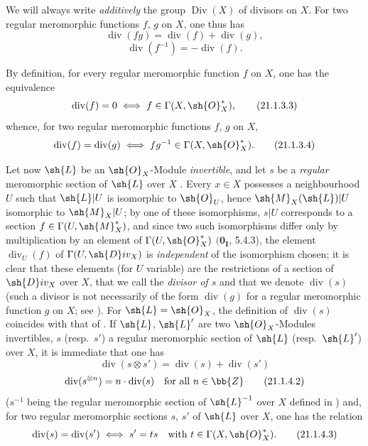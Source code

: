 \begin{env}[21.1.3]
\label{IV.21.1.3}
We will always write \emph{additively} the group $\operatorname{Div}(X)$ of divisors on $X$.
For two regular meromorphic functions $f$, $g$ on $X$, one thus has
\[
\label{IV.21.1.3.1}
  \operatorname{div}(fg)=\operatorname{div}(f)+\operatorname{div}(g),
  \tag{21.1.3.1}
\]
\[
\label{IV.21.1.3.2}
  \operatorname{div}(f^{-1})=-\operatorname{div}(f).
  \tag{21.1.3.2}
\]

By definition, for every regular meromorphic function $f$ on $X$, one has the equivalence
\[
\label{IV.21.1.3.3}
  \operatorname{div}(f)=0\iff f\in\Gamma(X,\sh{O}_X^*),
  \tag{21.1.3.3}
\]
whence, for two regular meromorphic functions $f$, $g$ on $X$,
\[
\label{IV.21.1.3.4}
  \operatorname{div}(f)=\operatorname{div}(g)\iff fg^{-1}\in\Gamma(X,\sh{O}_X^*).
  \tag{21.1.3.4}
\]
\end{env}

\begin{env}[21.1.4]
\label{IV.21.1.4}
Let now $\sh{L}$ be an $\sh{O}_X$-Module \emph{invertible}, and let $s$ be a \emph{regular} meromorphic section of $\sh{L}$ over $X$ .
Every $x\in X$ possesses a neighbourhood $U$ such that $\sh{L}|U$ is isomorphic to $\sh{O}_U$, hence $\sh{M}_X(\sh{L})|U$ isomorphic to $\sh{M}_X|U$;
by one of these isomorphisms, $s|U$ corresponds to a section $f\in\Gamma(U,\sh{M}_X^*)$, and since two such isomorphisms differ only by multiplication by an element of $\Gamma(U,\sh{O}_X^*)$ $(\mathbf{0_I}$, 5.4.3), the element $\operatorname{div}_U(f)$ of $\Gamma(U,\sh{D}iv_X)$ is \emph{independent} of the isomorphism chosen;
it is clear that these elements (for $U$ variable) are the restrictions of a section of $\sh{D}iv_X$ over $X$, that we call the \emph{divisor of $s$} and that we denote $\operatorname{div}(s)$ (such a divisor is not necessarily of the form $\operatorname{div}(g)$ for a regular meromorphic function $g$ on $X$;
see ).
For $\sh{L}=\sh{O}_X$, the definition of $\operatorname{div}(s)$ coincides with that of .
If $\sh{L}$, $\sh{L}'$ are two $\sh{O}_X$-Modules invertibles, $s$ (resp.\ $s'$) a regular meromorphic section of $\sh{L}$ (resp.\ $\sh{L}'$) over $X$, it is immediate that one has
\[
\label{IV.21.1.4.1}
  \operatorname{div}(s\otimes s')=\operatorname{div}(s)+\operatorname{div}(s')
  \tag{21.1.4.1}
\]
\[
\label{IV.21.1.4.2}
  \operatorname{div}(s^{\otimes n})=n\cdot\operatorname{div}(s)\quad\text{for all }n\in\bb{Z}
  \tag{21.1.4.2}
\]
($s^{-1}$ being the regular meromorphic section of $\sh{L}^{-1}$ over $X$ defined in )
and, for two regular meromorphic sections $s$, $s'$ of $\sh{L}$ over $X$, one has the relation
\[
\label{IV.21.1.4.3}
  \operatorname{div}(s)=\operatorname{div}(s')\iff s'=ts\quad\text{with }t\in\Gamma(X,\sh{O}_X^*).
  \tag{21.1.4.3}
\]
\end{env}

